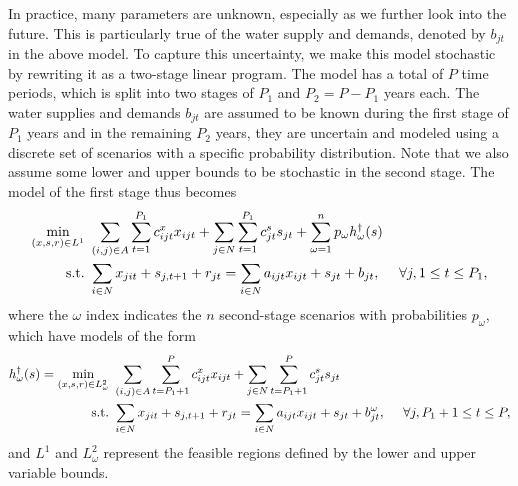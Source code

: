 \documentclass[12pt]{amsart}
\newcommand{\st}{\mbox{s.t.}}
\begin{document}
In practice, many parameters are unknown, especially as we further look into the future. 
This is particularly true of the water supply and demands, denoted by $b_{jt}$ in the above model. 
To capture this uncertainty, we make this model stochastic by rewriting it as a two-stage linear program.
The model has a total of $P$ time periods, which is split into two stages of $P_1$ and $P_2 = P - P_1$ years each. 
The water supplies and demands $b_{jt}$ are assumed to be known during the first stage of $P_1$ years and in the remaining $P_2$ years, they are uncertain and modeled using a discrete set of scenarios with a specific probability distribution.  
Note that we also assume some lower and upper bounds to be stochastic in the second stage. 
The model of the first stage thus becomes
\begin{align}
	\min_{(x,s,r) \in L^1} \ & \sum_{(i,j) \in A} \sum_{t=1}^{P_1} c_{ijt}^x x_{ijt} + \sum_{j \in N} \sum_{t=1}^{P_1} c_{jt}^s s_{jt} + \sum_{\omega=1}^n p_\omega h^\dagger_\omega(s) \label{eq:gen_network_two_stage} \\
	\st \ & \sum_{i \in N} x_{jit} + s_{j,t+1} + r_{jt} = \sum_{i \in N} a_{ijt} x_{ijt} + s_{jt} + b_{jt},\ \ \ \ \forall j, 1 \leq t \leq P_1, \notag
\end{align}
where the $\omega$ index indicates the $n$ second-stage scenarios with probabilities $p_\omega$, which have models of the form
\begin{align}
	h^\dagger_\omega(s) = \min_{(x,s,r) \in L^2_\omega} \ & \sum_{(i,j) \in A} \sum_{t=P_1+1}^{P} c_{ijt}^x x_{ijt} + \sum_{j \in N} \sum_{t=P_1+1}^{P} c_{jt}^s s_{jt} \label{eq:gen_network_second_stage} \\
	\st \ & \sum_{i \in N} x_{jit} + s_{j,t+1} + r_{jt} = \sum_{i \in N} a_{ijt} x_{ijt} + s_{jt} + b_{jt}^\omega, \ \ \ \ \forall j, P_1+1 \leq t \leq P, \notag
\end{align}
and $L^1$ and $L^2_\omega$ represent the feasible regions defined by the lower and upper variable bounds.
\end{document}
